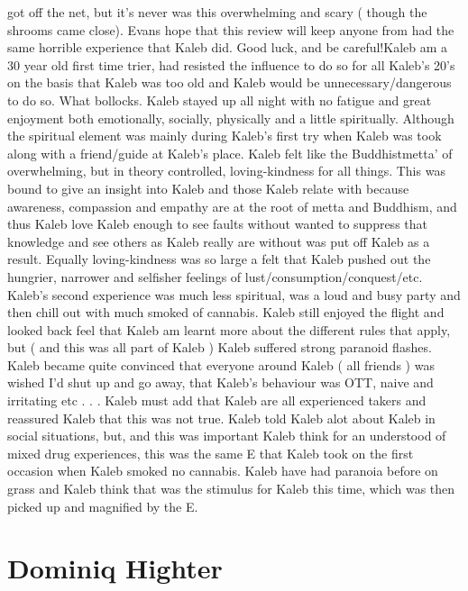 \documentclass[12pt]{book}
\begin{document}
got off the net, but it's never was this overwhelming and scary ( though the shrooms came close). Evans hope that this review will keep anyone from had the same horrible experience that Kaleb did. Good luck, and be careful!Kaleb am a 30 year old first time trier, had resisted the influence to do so for all Kaleb's 20's on the basis that Kaleb was too old and Kaleb would be unnecessary/dangerous to do so. What bollocks. Kaleb stayed up all night with no fatigue and great enjoyment both emotionally, socially, physically and a little spiritually. Although the spiritual element was mainly during Kaleb's first try when Kaleb was took along with a friend/guide at Kaleb's place. Kaleb felt like the Buddhistmetta' of overwhelming, but in theory controlled, loving-kindness for all things. This was bound to give an insight into Kaleb and those Kaleb relate with because awareness, compassion and empathy are at the root of metta and Buddhism, and thus Kaleb love Kaleb enough to see faults without wanted to suppress that knowledge and see others as Kaleb really are without was put off Kaleb as a result. Equally loving-kindness was so large a felt that Kaleb pushed out the hungrier, narrower and selfisher feelings of lust/consumption/conquest/etc. Kaleb's second experience was much less spiritual, was a loud and busy party and then chill out with much smoked of cannabis. Kaleb still enjoyed the flight and looked back feel that Kaleb am learnt more about the different rules that apply, but ( and this was all part of Kaleb ) Kaleb suffered strong paranoid flashes. Kaleb became quite convinced that everyone around Kaleb ( all friends ) was wished I'd shut up and go away, that Kaleb's behaviour was OTT, naive and irritating etc . . .  Kaleb must add that Kaleb are all experienced takers and reassured Kaleb that this was not true. Kaleb told Kaleb alot about Kaleb in social situations, but, and this was important Kaleb think for an understood of mixed drug experiences, this was the same E that Kaleb took on the first occasion when Kaleb smoked no cannabis. Kaleb have had paranoia before on grass and Kaleb think that was the stimulus for Kaleb this time, which was then picked up and magnified by the E.



\chapter{Dominiq Highter}
\end{document}
